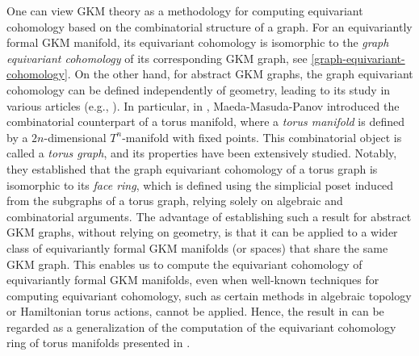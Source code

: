 \documentclass[12pt]{amsart}
\theoremstyle{remark}
\numberwithin{equation}{section}
\begin{document}
One can view GKM theory as a methodology for computing equivariant cohomology based on the combinatorial structure of a graph.
For an equivariantly formal GKM manifold, 
its equivariant cohomology is isomorphic to the {\it graph equivariant cohomology} of its corresponding GKM graph, see \eqref{graph-equivariant-cohomology}. 
On the other hand, for abstract GKM graphs, the graph equivariant cohomology can be defined independently of geometry, leading to its study in various articles 
(e.g., \cite{DKS, FY, FIM, GHZ, GSZ, KU, KS, MMP}).
In particular, in \cite{MMP}, Maeda-Masuda-Panov introduced the combinatorial counterpart of a torus manifold, where a {\it torus manifold} is defined by a $2n$-dimensional $T^{n}$-manifold with fixed points.
This combinatorial object is called a {\it torus graph}, and 
its properties have been extensively studied. 
Notably, they established that the graph equivariant cohomology of a torus graph is isomorphic to its {\it face ring}, which is defined using the simplicial poset induced from the subgraphs of a torus graph, relying solely on algebraic and combinatorial arguments.
The advantage of establishing such a result for abstract GKM graphs, without relying on geometry, is that it can be applied to 
a wider class of equivariantly formal GKM manifolds (or spaces) that share the same GKM graph.
This enables us to compute the equivariant cohomology of equivariantly formal GKM manifolds, even when well-known techniques for computing equivariant cohomology,  such as certain methods in algebraic topology or Hamiltonian torus actions, cannot be applied.
Hence, the result in \cite{MMP} can be regarded as a generalization of the computation of the equivariant cohomology ring of torus manifolds presented in \cite{MP}. 
\end{document}

